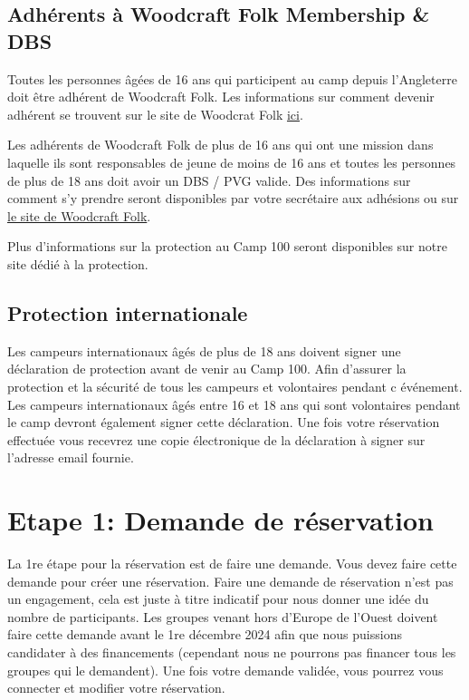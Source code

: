 \documentclass[a4paper, 11pt]{report}
\begin{document}
\section{Adh\'erents \`a Woodcraft Folk Membership \& DBS}
Toutes les personnes \^ag\'ees de 16 ans qui participent au camp depuis l'Angleterre doit \^etre adh\'erent de Woodcraft Folk. Les informations sur comment devenir adh\'erent se trouvent sur le site de Woodcrat Folk \href{https://woodcraft.org.uk/get-involved/volunteering-with-woodcraft-folk/}{ici}.

Les adh\'erents de Woodcraft Folk de plus de 16 ans qui ont une mission dans laquelle ils sont responsables de jeune de moins de 16 ans et toutes les personnes de plus de 18 ans doit avoir un DBS / PVG valide. 
Des informations sur comment s'y prendre seront disponibles par votre secr\'etaire aux adh\'esions ou sur \href{https://woodcraft.org.uk/get-involved/volunteering-with-woodcraft-folk/}{le site de Woodcraft Folk}.

Plus d'informations sur la protection au Camp 100 seront disponibles sur notre site d\'edi\'e \`a la protection. 

\section{Protection internationale}
Les campeurs internationaux \^ag\'es de plus de 18 ans doivent signer une d\'eclaration de protection avant de venir au Camp 100. Afin d'assurer la protection et la s\'ecurit\'e de tous les campeurs et volontaires pendant c \'ev\'enement. Les campeurs internationaux \^ag\'es entre 16 et 18 ans qui sont volontaires pendant le camp devront \'egalement signer cette d\'eclaration. Une fois votre r\'eservation effectu\'ee vous recevrez une copie \'electronique de la d\'eclaration \`a signer sur l'adresse email fournie. 



\chapter{Etape 1: Demande de r\'eservation}
\label{chap:apply}
La 1re \'etape pour la r\'eservation est de faire une demande. Vous devez faire cette demande pour cr\'eer une r\'eservation. Faire une demande de r\'eservation n'est pas un engagement, cela est juste \`a titre indicatif pour nous donner une id\'ee du nombre de participants. Les groupes venant hors d'Europe de l'Ouest doivent faire cette demande avant le 1re d\'ecembre 2024 afin que nous puissions candidater \`a des financements (cependant nous ne pourrons pas financer tous les groupes qui le demandent). Une fois votre demande valid\'ee, vous pourrez vous connecter et modifier votre r\'eservation. 
\end{document}
